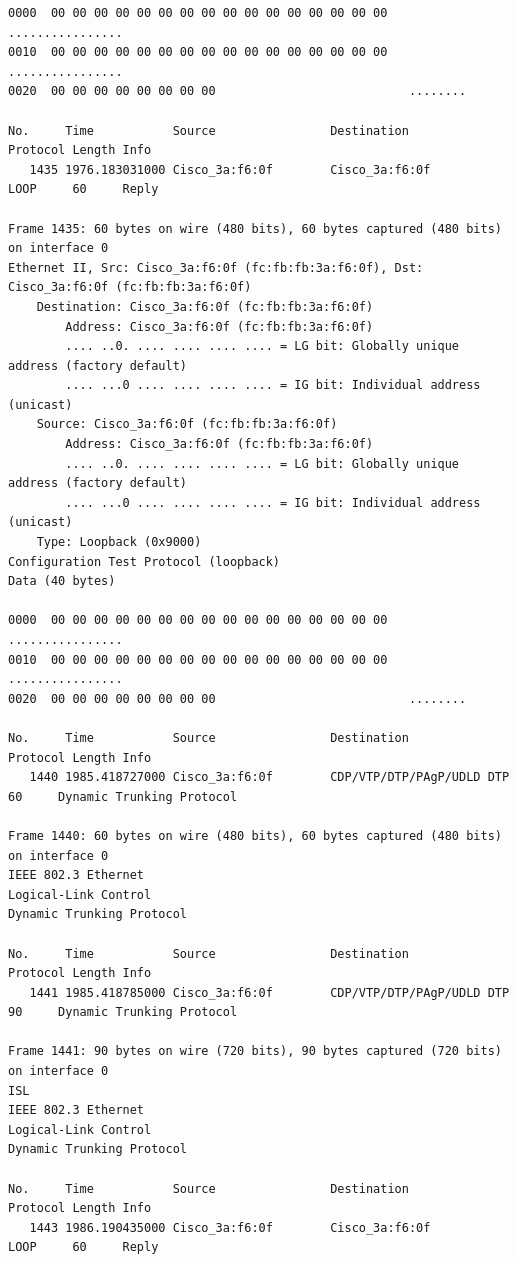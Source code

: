 \documentclass[a4paper,11pt]{article}
\begin{document}
\begin{lstlisting}
0000  00 00 00 00 00 00 00 00 00 00 00 00 00 00 00 00   ................
0010  00 00 00 00 00 00 00 00 00 00 00 00 00 00 00 00   ................
0020  00 00 00 00 00 00 00 00                           ........

No.     Time           Source                Destination           Protocol Length Info
   1435 1976.183031000 Cisco_3a:f6:0f        Cisco_3a:f6:0f        LOOP     60     Reply

Frame 1435: 60 bytes on wire (480 bits), 60 bytes captured (480 bits) on interface 0
Ethernet II, Src: Cisco_3a:f6:0f (fc:fb:fb:3a:f6:0f), Dst: Cisco_3a:f6:0f (fc:fb:fb:3a:f6:0f)
    Destination: Cisco_3a:f6:0f (fc:fb:fb:3a:f6:0f)
        Address: Cisco_3a:f6:0f (fc:fb:fb:3a:f6:0f)
        .... ..0. .... .... .... .... = LG bit: Globally unique address (factory default)
        .... ...0 .... .... .... .... = IG bit: Individual address (unicast)
    Source: Cisco_3a:f6:0f (fc:fb:fb:3a:f6:0f)
        Address: Cisco_3a:f6:0f (fc:fb:fb:3a:f6:0f)
        .... ..0. .... .... .... .... = LG bit: Globally unique address (factory default)
        .... ...0 .... .... .... .... = IG bit: Individual address (unicast)
    Type: Loopback (0x9000)
Configuration Test Protocol (loopback)
Data (40 bytes)

0000  00 00 00 00 00 00 00 00 00 00 00 00 00 00 00 00   ................
0010  00 00 00 00 00 00 00 00 00 00 00 00 00 00 00 00   ................
0020  00 00 00 00 00 00 00 00                           ........

No.     Time           Source                Destination           Protocol Length Info
   1440 1985.418727000 Cisco_3a:f6:0f        CDP/VTP/DTP/PAgP/UDLD DTP      60     Dynamic Trunking Protocol

Frame 1440: 60 bytes on wire (480 bits), 60 bytes captured (480 bits) on interface 0
IEEE 802.3 Ethernet 
Logical-Link Control
Dynamic Trunking Protocol

No.     Time           Source                Destination           Protocol Length Info
   1441 1985.418785000 Cisco_3a:f6:0f        CDP/VTP/DTP/PAgP/UDLD DTP      90     Dynamic Trunking Protocol

Frame 1441: 90 bytes on wire (720 bits), 90 bytes captured (720 bits) on interface 0
ISL
IEEE 802.3 Ethernet 
Logical-Link Control
Dynamic Trunking Protocol

No.     Time           Source                Destination           Protocol Length Info
   1443 1986.190435000 Cisco_3a:f6:0f        Cisco_3a:f6:0f        LOOP     60     Reply


\end{lstlisting}
\end{document}
